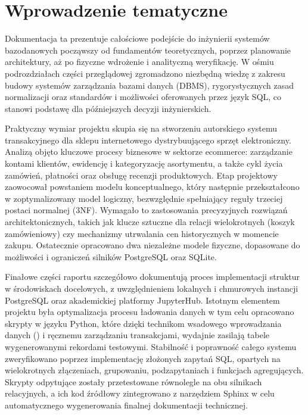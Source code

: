 \documentclass[letterpaper,10pt,polish]{sphinxmanual}
\begin{document}
\section{Wprowadzenie tematyczne}
\label{\detokenize{rozdzia_u0142_1/index:wprowadzenie-tematyczne}}
\sphinxAtStartPar
Dokumentacja ta prezentuje całościowe podejście do inżynierii systemów bazodanowych \textendash{} począwszy od fundamentów teoretycznych, poprzez planowanie architektury, aż po fizyczne wdrożenie i analityczną weryfikację. W ośmiu podrozdziałach części przeglądowej zgromadzono niezbędną wiedzę z zakresu budowy systemów zarządzania bazami danych (DBMS), rygorystycznych zasad normalizacji oraz standardów i możliwości oferowanych przez język SQL, co stanowi podstawę dla późniejszych decyzji inżynierskich.

\sphinxAtStartPar
Praktyczny wymiar projektu skupia się na stworzeniu autorskiego systemu transakcyjnego dla sklepu internetowego dystrybuującego sprzęt elektroniczny. Analizą objęto kluczowe procesy biznesowe w sektorze e\sphinxhyphen{}commerce: zarządzanie kontami klientów, ewidencję i kategoryzację asortymentu, a także cykl życia zamówień, płatności oraz obsługę recenzji produktowych. Etap projektowy zaowocował powstaniem modelu konceptualnego, który następnie przekształcono w zoptymalizowany model logiczny, bezwzględnie spełniający reguły trzeciej postaci normalnej (3NF). Wymagało to zastosowania precyzyjnych rozwiązań architektonicznych, takich jak klucze sztuczne dla relacji wielokrotnych (koszyk zamówieniowy) czy mechanizmy utrwalania cen historycznych w momencie zakupu. Ostatecznie opracowano dwa niezależne modele fizyczne, dopasowane do możliwości i ograniczeń silników PostgreSQL oraz SQLite.

\sphinxAtStartPar
Finałowe części raportu szczegółowo dokumentują proces implementacji struktur w środowiskach docelowych, z uwzględnieniem lokalnych i chmurowych instancji PostgreSQL oraz akademickiej platformy JupyterHub. Istotnym elementem projektu była optymalizacja procesu ładowania danych \textendash{} w tym celu opracowano skrypty w języku Python, które dzięki technikom wsadowego wprowadzania danych () i ręcznemu zarządzaniu transakcjami, wydajnie zasilają tabele wygenerowanymi rekordami testowymi. Stabilność i poprawność całego systemu zweryfikowano poprzez implementację złożonych zapytań SQL, opartych na wielokrotnych złączeniach, grupowaniu, podzapytaniach i funkcjach agregujących. Skrypty odpytujące zostały przetestowane równolegle na obu silnikach relacyjnych, a ich kod źródłowy zintegrowano z narzędziem Sphinx w celu automatycznego wygenerowania finalnej dokumentacji technicznej.
\end{document}
